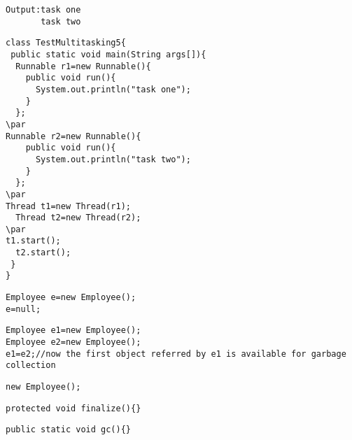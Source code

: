 \documentclass{book}
\def\lthtmlcheckvsize{\ifdim\ht\sizebox<\vsize 
  \ifdim\wd\sizebox<\hsize\expandafter\hfill\fi \expandafter\vfill
  \else\expandafter\vss\fi}%
\begin{document}
{\newpage\clearpage
{}%
\begin{lstlisting}
Output:task one
       task two
\end{lstlisting}%
\lthtmlfigureZ
\lthtmlcheckvsize\clearpage}

{\newpage\clearpage
{}%
\begin{lstlisting}
class TestMultitasking5{  
 public static void main(String args[]){  
  Runnable r1=new Runnable(){  
    public void run(){  
      System.out.println("task one");  
    }  
  };  
\par
Runnable r2=new Runnable(){  
    public void run(){  
      System.out.println("task two");  
    }  
  };  
\par
Thread t1=new Thread(r1);  
  Thread t2=new Thread(r2);  
\par
t1.start();  
  t2.start();  
 }  
}  
\end{lstlisting}%
\lthtmlfigureZ
\lthtmlcheckvsize\clearpage}

{\newpage\clearpage
{}%
\begin{lstlisting}
Employee e=new Employee();  
e=null;  
\end{lstlisting}%
\lthtmlfigureZ
\lthtmlcheckvsize\clearpage}

{\newpage\clearpage
{}%
\begin{lstlisting}
Employee e1=new Employee();  
Employee e2=new Employee();  
e1=e2;//now the first object referred by e1 is available for garbage collection  
\end{lstlisting}%
\lthtmlfigureZ
\lthtmlcheckvsize\clearpage}

{\newpage\clearpage
{}%
\begin{lstlisting}
new Employee();
\end{lstlisting}%
\lthtmlfigureZ
\lthtmlcheckvsize\clearpage}

{\newpage\clearpage
{}%
\begin{lstlisting}
protected void finalize(){}  
\end{lstlisting}%
\lthtmlfigureZ
\lthtmlcheckvsize\clearpage}

{\newpage\clearpage
{}%
\begin{lstlisting}
public static void gc(){}  
\end{lstlisting}%
\lthtmlfigureZ
\lthtmlcheckvsize\clearpage}
\end{document}
